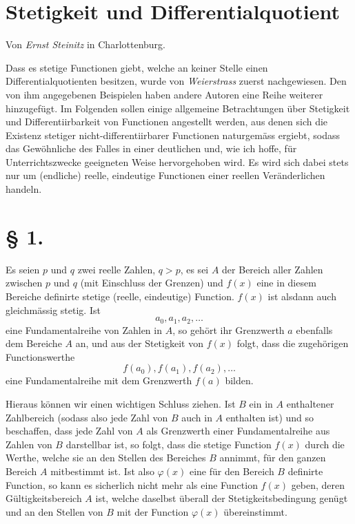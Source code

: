 
\section*{Stetigkeit und Differentialquotient}
\begin{center}
Von \emph{Ernst Steinitz} in Charlottenburg.
\end{center}

Dass es stetige Functionen giebt, welche an keiner Stelle einen Differentialquotienten besitzen, wurde von \emph{Weierstrass} zuerst nachgewiesen. Den von ihm angegebenen Beispielen haben andere Autoren eine Reihe weiterer hinzugefügt. Im Folgenden sollen einige allgemeine Betrachtungen über Stetigkeit und Differentiirbarkeit von Functionen angestellt werden, aus denen sich die Existenz stetiger nicht-differentiirbarer Functionen naturgemäss ergiebt, sodass das Gewöhnliche des Falles in einer deutlichen und, wie ich hoffe, für Unterrichtszwecke geeigneten Weise hervorgehoben wird. Es wird sich dabei stets nur um (endliche) reelle, eindeutige Functionen einer reellen Veränderlichen handeln.

\section*{§ 1.}

Es seien $p$ und $q$ zwei reelle Zahlen, $q>p$, es sei $A$ der Bereich aller Zahlen zwischen $p$ und $q$ (mit Einschluss der Grenzen) und $f(x)$ eine in diesem Bereiche definirte stetige (reelle, eindeutige) Function. $f(x)$ ist alsdann auch gleichmässig stetig. Ist
\[
 a_0, a_1, a_2, \ldots
\]
eine Fundamentalreihe von Zahlen in $A$, so gehört ihr Grenzwerth $a$ ebenfalls dem Bereiche $A$ an, und aus der Stetigkeit von $f(x)$ folgt, dass die zugehörigen Functionswerthe
\[
 f(a_0), f(a_1), f(a_2), \ldots
\]
eine Fundamentalreihe mit dem Grenzwerth $f(a)$ bilden.

Hieraus können wir einen wichtigen Schluss ziehen. Ist $B$ ein in $A$ enthaltener Zahlbereich (sodass also jede Zahl von $B$ auch in $A$ enthalten ist) und so beschaffen, dass jede Zahl von $A$ als Grenzwerth einer Fundamentalreihe aus Zahlen von $B$ darstellbar ist, so folgt, dass die stetige Function $f(x)$ durch die Werthe, welche sie an den Stellen des Bereiches $B$ annimmt, für den ganzen Bereich $A$ mitbestimmt ist. Ist also $\varphi(x)$ eine für den Bereich $B$ definirte Function, so kann es sicherlich nicht mehr als eine Function $f(x)$ geben, deren Gültigkeitsbereich $A$ ist, welche daselbst überall der Stetigkeitsbedingung genügt und an den Stellen von $B$ mit der Function $\varphi(x)$ übereinstimmt.

